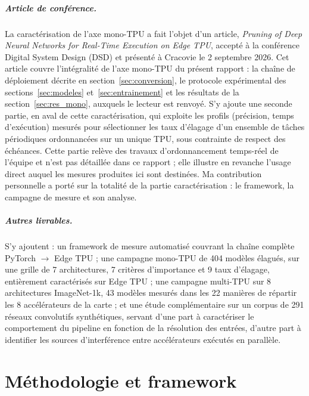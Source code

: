\documentclass[11pt,a4paper]{report}
\begin{document}
\paragraph{Article de conférence.} La caractérisation de l'axe mono-TPU a fait l'objet d'un article, \emph{Pruning of Deep Neural Networks for Real-Time Execution on Edge TPU}, accepté à la conférence Digital System Design (DSD) et présenté à Cracovie le 2 septembre 2026.
Cet article couvre l'intégralité de l'axe mono-TPU du présent rapport : la chaîne de déploiement décrite en section~\ref{sec:conversion}, le protocole expérimental des sections~\ref{sec:modeles} et~\ref{sec:entrainement} et les résultats de la section~\ref{sec:res_mono}, auxquels le lecteur est renvoyé. S'y ajoute une seconde partie, en aval de cette caractérisation, qui exploite les profils (précision, temps d'exécution) mesurés pour sélectionner les taux d'élagage d'un ensemble de tâches périodiques ordonnancées sur un unique TPU, sous contrainte de respect des échéances. Cette partie relève des travaux d'ordonnancement temps-réel de l'équipe et n'est pas détaillée dans ce rapport ; elle illustre en revanche l'usage direct auquel les mesures produites ici sont destinées. Ma contribution personnelle a porté sur la totalité de la partie caractérisation : le framework, la campagne de mesure et son analyse.

\paragraph{Autres livrables.} S'y ajoutent : un framework de mesure automatisé couvrant la chaîne complète PyTorch $\rightarrow$ Edge TPU ; une campagne mono-TPU de 404 modèles élagués, sur une grille de 7 architectures, 7 critères d'importance et 9 taux d'élagage, entièrement caractérisés sur Edge TPU ; une campagne multi-TPU sur 8 architectures ImageNet-1k, 43 modèles mesurés dans les 22 manières de répartir les 8 accélérateurs de la carte ; et une étude complémentaire sur un corpus de 291 réseaux convolutifs synthétiques, servant d'une part à caractériser le comportement du pipeline en fonction de la résolution des entrées, d'autre part à identifier les sources d'interférence entre accélérateurs exécutés en parallèle.

\chapter{Méthodologie et framework}
\label{chap:methodo}
\end{document}
